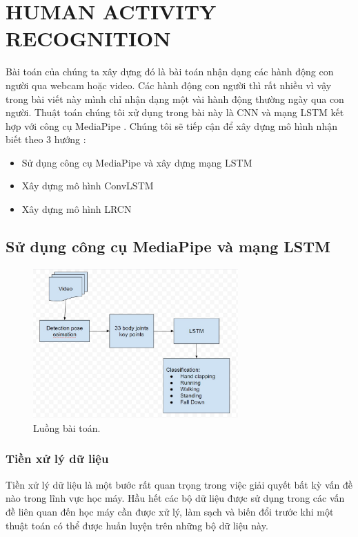 
\chapter{HUMAN ACTIVITY RECOGNITION} 

\label{Chapter3} 
Bài toán của chúng ta xây dựng đó là bài toán nhận dạng các hành động con người qua webcam hoặc video. Các hành động con người thì rất nhiều vì vậy trong bài viết này mình chỉ nhận dạng một vài hành động thường ngày qua con người. Thuật toán chúng tôi xử dụng trong bài này là CNN và mạng LSTM kết hợp với công cụ MediaPipe . Chúng tôi sẽ tiếp cận để xây dựng mô hình nhận biết theo 3 hướng :
\begin{itemize}
    \item Sử dụng công cụ MediaPipe và xây dựng mạng LSTM
    \item Xây dựng mô hình ConvLSTM
    \item Xây dựng mô hình LRCN
\end{itemize}

\section{Sử dụng công cụ MediaPipe và mạng LSTM}
    \begin{figure}[h!]
	\centering
	\includegraphics[width=0.7\textwidth]{Figures/luongbaitoan.jpeg}
	\caption[Luồng bài toán .]{Luồng bài toán.}
	\label{luongbaitoan.jpeg} 
    \end{figure}

\subsection{Tiền xử lý dữ liệu }
Tiền xử lý dữ liệu là một bước rất quan trọng trong việc giải quyết bất kỳ vấn đề nào trong lĩnh vực học máy. Hầu hết các bộ dữ liệu được sử dụng trong các vấn đề liên quan đến học máy cần được xử lý, làm sạch và biến đổi trước khi một thuật toán có thể được huấn luyện trên những bộ dữ liệu này.
